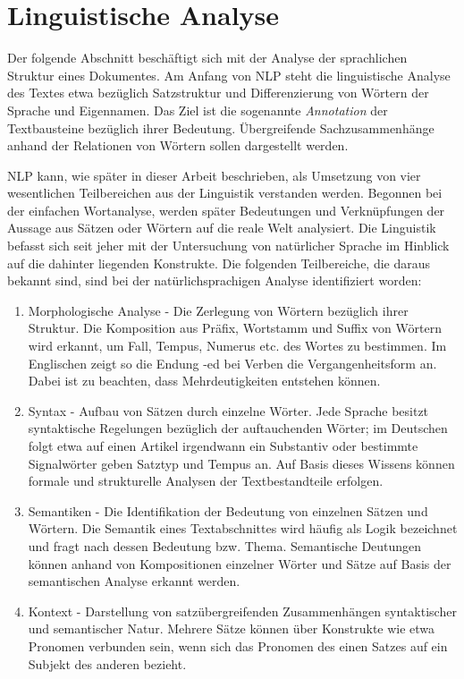 \documentclass[12pt]{report}
\begin{document}
\section{Linguistische Analyse}
Der folgende Abschnitt beschäftigt sich mit der Analyse der sprachlichen Struktur eines Dokumentes. Am Anfang von NLP steht die linguistische Analyse des Textes etwa bezüglich Satzstruktur und Differenzierung von Wörtern der Sprache und Eigennamen. Das Ziel ist die sogenannte \textit{Annotation} der Textbausteine bezüglich ihrer Bedeutung. Übergreifende Sachzusammenhänge anhand der Relationen von Wörtern sollen dargestellt werden.

NLP kann, wie später in dieser Arbeit beschrieben, als Umsetzung von vier wesentlichen Teilbereichen aus der Linguistik verstanden werden. Begonnen bei der einfachen Wortanalyse, werden später Bedeutungen und Verknüpfungen der Aussage aus Sätzen oder Wörtern auf die reale Welt analysiert. Die Linguistik befasst sich seit jeher mit der Untersuchung von natürlicher Sprache im Hinblick auf die dahinter liegenden Konstrukte. Die folgenden Teilbereiche, die daraus bekannt sind, sind bei der natürlichsprachigen Analyse identifiziert worden:

\begin{enumerate}
\item
Morphologische Analyse - Die Zerlegung von Wörtern bezüglich ihrer Struktur. Die Komposition aus Präfix, Wortstamm und Suffix von Wörtern wird erkannt, um Fall, Tempus, Numerus etc. des Wortes zu bestimmen. Im Englischen zeigt so die Endung -ed bei Verben die Vergangenheitsform an. Dabei ist zu beachten, dass Mehrdeutigkeiten entstehen können.
\item
Syntax - Aufbau von Sätzen durch einzelne Wörter. Jede Sprache besitzt syntaktische Regelungen bezüglich der auftauchenden Wörter; im Deutschen folgt etwa auf einen Artikel irgendwann ein Substantiv oder bestimmte Signalwörter geben Satztyp und Tempus an. Auf Basis dieses Wissens können formale und strukturelle Analysen der Textbestandteile erfolgen.
\item
Semantiken - Die Identifikation der Bedeutung von einzelnen Sätzen und Wörtern. Die Semantik eines Textabschnittes wird häufig als \glqq  Logik\grqq{} bezeichnet und fragt nach dessen Bedeutung bzw. Thema. Semantische Deutungen können anhand von Kompositionen einzelner Wörter und Sätze auf Basis der semantischen Analyse erkannt werden.
\item
Kontext - Darstellung von satzübergreifenden Zusammenhängen syntaktischer und semantischer Natur. Mehrere Sätze können über Konstrukte wie etwa Pronomen verbunden sein, wenn sich das Pronomen des einen Satzes auf ein Subjekt des anderen bezieht. 
\end{enumerate}
\end{document}
